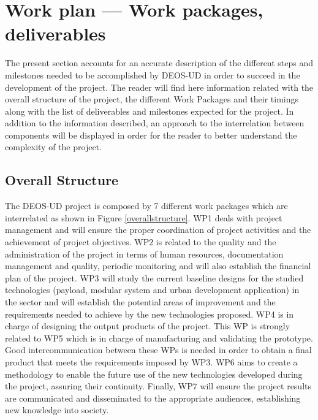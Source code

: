 \section{Work plan — Work packages, deliverables}

The present section accounts for an accurate description of the different steps and milestones needed to be accomplished by DEOS-UD in order to succeed in the development of the project. The reader will find here information related with the overall structure of the project, the different Work Packages and their timings along with the list of deliverables and milestones expected for the project. In addition to the information described, an approach to the interrelation between components will be displayed in order for the reader to better understand the complexity of the project.  

\subsection{Overall Structure}

The DEOS-UD project is composed by 7 different work packages which are interrelated as shown in Figure \ref{overallstructure}. WP1 deals with project management and will ensure the proper coordination of project activities and the achievement of project objectives. WP2 is related to the quality and the administration of the project in terms of human resources, documentation management and quality, periodic monitoring and will also establish the financial plan of the project. WP3 will study the current baseline designs for the studied technologies (payload, modular system and urban development application) in the sector and will establish the potential areas of improvement and the requirements needed to achieve by the new technologies proposed. WP4 is in charge of designing the output products of the project. This WP is strongly related to WP5 which is in charge of manufacturing and validating the prototype. Good intercommunication between these WPs is needed in order to obtain a final product that meets the requirements imposed by WP3. WP6 aims to create a methodology to enable the future use of the new technologies developed during the project, assuring their continuity. Finally, WP7 will ensure the project results are communicated and disseminated to the appropriate audiences, establishing new knowledge into society. 

